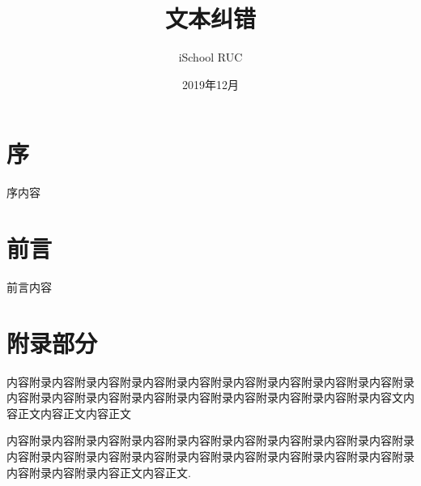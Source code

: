 \documentclass[utf8, a4paper,12pt, svgnames, twoside]{book}
\begin{document}
\title{\heiti 文本纠错}
\author{iSchool RUC}
\date{2019年12月}

\frontmatter
\maketitle


\chapter{序}

序内容


\chapter{前言}

前言内容

\renewcommand\contentsname{目录}
\tableofcontents

\mainmatter







\appendix

\chapter{附录部分}

内容附录内容附录内容附录内容附录内容附录内容附录内容附录内容附录内容附录内容附录内容附录内容附录内容附录内容附录内容附录内容附录内容附录内容文内容正文内容正文内容正文

内容附录内容附录内容附录内容附录内容附录内容附录内容附录内容附录内容附录内容附录内容附录内容附录内容附录内容附录内容附录内容附录内容附录内容附录内容附录内容附录内容正文内容正文\cite{DK1}.

\renewcommand\indexname{索~~引}
\printindex
{}

\backmatter
\end{document}

